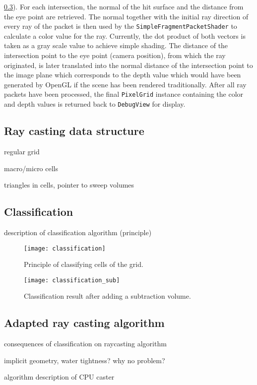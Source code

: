 \ref{sec:adapted_ray_casting}). For each intersection, the normal of the hit surface and the distance from the eye point are retrieved. The normal together with the initial ray direction of every ray of the packet is then used by the \lstinline!SimpleFragmentPacketShader! to calculate a color value for the ray. Currently, the dot product of both vectors is taken as a gray scale value to achieve simple shading. The distance of the intersection point to the eye point (camera position), from which the ray originated, is later translated into the normal distance of the intersection point to the image plane which corresponds to the depth value which would have been generated by OpenGL if the scene has been rendered traditionally. After all ray packets have been processed, the final \lstinline!PixelGrid! instance containing the color and depth values is returned back to \lstinline!DebugView! for display.

\subsection{Ray casting data structure}
\label{sec:data_structure}

regular grid

macro/micro cells

triangles in cells, pointer to sweep volumes


\subsection{Classification}
\label{sec:classification}



description of classification algorithm (principle)

\begin{figure}
\centering
\texttt{[image: classification]}
\caption{Principle of classifying cells of the grid.}
\label{fig:classification}
\end{figure}

\begin{figure}
\centering
\texttt{[image: classification\_sub]}
\caption{Classification result after adding a subtraction volume. }
\label{fig:classification_sub}
\end{figure}

\subsection{Adapted ray casting algorithm}
\label{sec:adapted_ray_casting}

consequences of classification on raycasting algorithm

implicit geometry, water tightness? why no problem?

algorithm description of CPU caster
